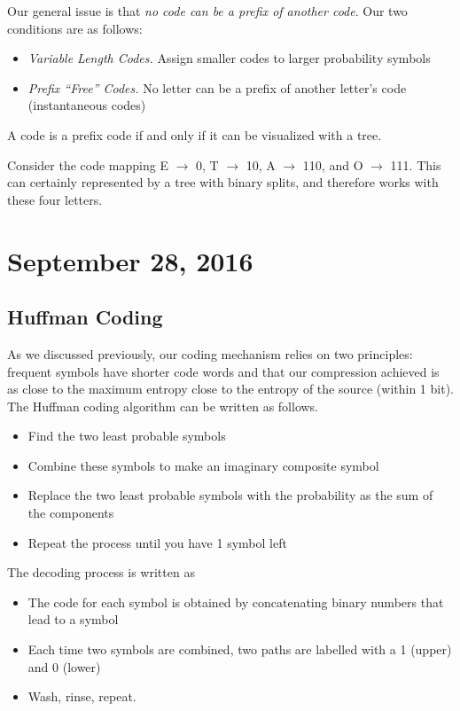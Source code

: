 \documentclass[11pt]{article}
\theoremstyle{definition}
\begin{document}
\noindent Our general issue is that \textit{no code can be a prefix of another code}. Our two conditions are as follows:
\begin{itemize}  
\item \textit{Variable Length Codes.} Assign smaller codes to larger probability symbols
\item \textit{Prefix ``Free'' Codes.} No letter can be a prefix of another letter's code (instantaneous codes)
\end{itemize}
\remark A code is a prefix code if and only if it can be visualized with a tree. 

\example Consider the code mapping E $\rightarrow$ 0, T $\rightarrow$ 10, A $\rightarrow$ 110, and O $\rightarrow$ 111. This can certainly represented by a tree with binary splits, and therefore works with these four letters. 

\section{September 28, 2016}

\subsection{Huffman Coding}

As we discussed previously, our coding mechanism relies on two principles: frequent symbols have shorter code words and that our compression achieved is as close to the maximum entropy close to the entropy of the source (within 1 bit). \\

\noindent The Huffman coding algorithm can be written as follows.
\begin{itemize}
\item Find the two least probable symbols
\item Combine these symbols to make an imaginary composite symbol
\item Replace the two least probable symbols with the probability as the sum of the components
\item Repeat the process until you have 1 symbol left
\end{itemize}
\noindent The decoding process is written as 
\begin{itemize}
\item The code for each symbol is obtained by concatenating binary numbers that lead to a symbol
\item Each time two symbols are combined, two paths are labelled with a 1 (upper) and 0 (lower)
\item Wash, rinse, repeat. 
\end{itemize}
\end{document}
